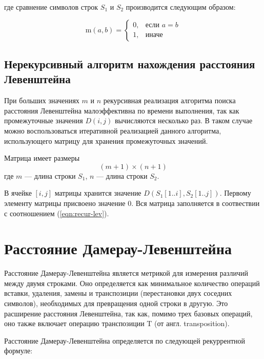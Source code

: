 \noindent где сравнение символов строк $S_1$ и $S_2$ производится следующим образом:

\begin{equation}
    \text{m}(a, b) = 
    \begin{cases}
        0, &\text{если $a = b$}\\
        1, &\text{иначе}
    \end{cases}
\end{equation}

\subsection{Нерекурсивный алгоритм нахождения рас\-стояния Левенштейна}
При больших значениях $m$ и $n$ рекурсивная реализация алгоритма поиска расстояния Левенштейна малоэффективна по времени выполнения, так как промежуточные значения $D(i, j)$ вычисляются несколько раз. В таком случае можно воспользоваться итеративной реализацией данного алгоритма, использующего матрицу для хранения промежуточных значений.

Матрица имеет размеры
\begin{equation}
(m + 1) \times (n + 1)
\end{equation}
\noindent где $m$ --- длина строки $S_1$, $n$ --- длина строки $S_2$.

В ячейке $[i, j]$ матрицы хранится значение $D(S_1[1..i], S_2[1..j])$. Пер\-вому элементу матрицы присвоено значение $0$. Вся матрица заполняется в соотвествии с соотношением (\ref{eqn:recur-lev}).

\section{Расстояние Дамерау-Левенштейна}

Расстояние Дамерау-Левенштейна является метрикой для измерения различий между двумя строками. Оно определяется как минимальное количество операций вставки, удаления, замены и транспозиции (перестановки двух соседних символов), необходимых для превращения одной строки в другую. Это расширение расстояния Левенштейна, так как, помимо трех базовых операций, оно также включает операцию транспозиции T (от англ. transposition).

Расстояние Дамерау-Левенштейна определяется по следующей рекуррентной формуле:


